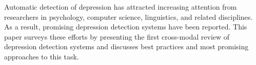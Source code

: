 Automatic detection of depression has attracted increasing attention from researchers in psychology, computer science, linguistics, and related disciplines. As a result, promising depression detection systems have been reported. This paper surveys these efforts by presenting the first cross-modal review of depression detection systems and discusses best practices and most promising approaches to this task.
